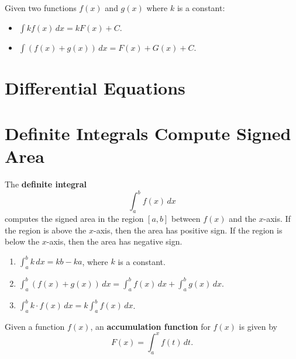 \documentclass{ximera}
\renewcommand{\d}{\,d}
\begin{document}
\begin{theorem}\label{theorem:SRA}
Given two functions $f(x)$ and $g(x)$ where $k$ is a constant:
\begin{itemize}
\item $\int k f(x) \d x= kF(x) + C$.
\item $\int \left(f(x) + g(x)\right) \d x = F(x) + G(x) + C$.
\end{itemize}
\end{theorem}






\section*{Differential Equations}







\section*{Definite Integrals Compute Signed Area}





\begin{definition}
The \textbf{definite integral}
\[
\int_a^b f(x) \d x
\]
computes the signed area in the region $[a,b]$ between $f(x)$ and the
$x$-axis. If the region is above the $x$-axis, then the area has
positive sign. If the region is below the $x$-axis, then the area has
negative sign.
\end{definition}


\begin{theorem}
\begin{enumerate}
\item $\int_a^b k \d x= kb-ka$, where $k$ is a constant.
\item $\int_a^b \left( f(x) + g(x) \right) \d x = \int_a^b f(x) \d x + \int_a^b
g(x) \d x$.
\item $\int_a^b k \cdot f(x) \d x = k \int_a^b f(x) \d x$.
\end{enumerate}
\end{theorem}



\begin{definition} %
Given a function $f(x)$, an \textbf{accumulation function} for
$f(x)$ is given by
\[
F(x) = \int_a^x f(t) \d t.
\]
\end{definition}
\end{document}
